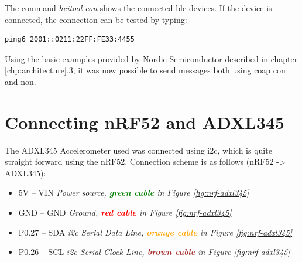 The command \textit{hcitool con} shows the connected \gls{ble} devices. If the device is connected, the connection can be tested by typing:

\begin{verbatim}
ping6 2001::0211:22FF:FE33:4455
\end{verbatim}


Using the basic examples provided by Nordic Semiconductor described in chapter \ref{chp:architecture}.3, it was now possible to send messages both using \gls{coap} \gls{con} and \gls{non}.  


\section{Connecting nRF52 and ADXL345}


The ADXL345 Accelerometer used was connected using \gls{i2c}, which is quite straight forward using the nRF52. Connection scheme is as follows (nRF52 -> ADXL345): 

\begin{itemize}
  \item 5V -- VIN		\tab  	\textit{Power source, \textbf{\textcolor{green}{green cable}} in Figure \ref{fig:nrf-adxl345}}
  \item GND -- GND 		\tab 	\textit{Ground, \textbf{\textcolor{red}{red cable}} in Figure \ref{fig:nrf-adxl345}}
  \item P0.27 -- SDA	\tab	\textit{\gls{i2c} Serial Data Line, \textbf{\textcolor{orange}{orange cable}} in Figure \ref{fig:nrf-adxl345}}
  \item P0.26 -- SCL	\tab 	\textit{\gls{i2c} Serial Clock Line, \textbf{\textcolor{brown}{brown cable}} in Figure \ref{fig:nrf-adxl345}}
\end{itemize} 



